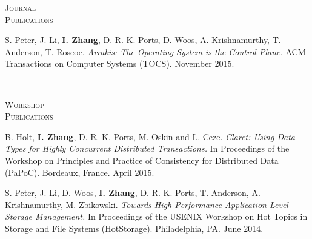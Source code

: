 \documentclass[10pt,minionpro]{report}
\newlength{\sectiongap}
\newlength{\sectioncolwidth}
\newlength{\colgap}
\newlength{\stuffwidth}
\newenvironment{rtable}{
  \begin{minipage}{\textwidth}
  }{
  \end{minipage}
}
\newenvironment{rsection}[1]{
  \begin{minipage}[t]{\sectioncolwidth}
    \textsc{#1}
  \end{minipage}
  \hspace{\colgap}
  \begin{minipage}[t]{\stuffwidth}
  }{
    \removelastskip
  \end{minipage}
  \\[\sectiongap]
}
\begin{document}
\begin{rtable}
\begin{rsection}{Journal\\Publications}
    S. Peter, J. Li, \textbf{I. Zhang}, D. R. K. Ports, D. Woos,
    A. Krishnamurthy, T. Anderson, T. Roscoe.  \textit{Arrakis: The
      Operating System is the Control Plane.}  ACM Transactions on
    Computer Systems (TOCS). November 2015.\\
  \end{rsection}


  
  \begin{rsection}{Workshop\\Publications}
    B. Holt, \textbf{I. Zhang}, D. R. K. Ports, M. Oskin and L. Ceze.
    \textit{Claret: Using Data Types for Highly Concurrent Distributed
      Transactions.} In Proceedings of the Workshop on Principles and
    Practice of Consistency for Distributed Data (PaPoC).  Bordeaux,
    France. April 2015.\\\vspace{-0.5em}


    S. Peter, J. Li, D. Woos, \textbf{I. Zhang}, D. R. K. Ports,
    T. Anderson, A. Krishnamurthy, M. Zbikowski. \textit{Towards
      High-Performance Application-Level Storage Management.} In
    Proceedings of the USENIX Workshop on Hot Topics in Storage and
    File Systems (HotStorage). Philadelphia, PA. June
    2014.
  \end{rsection}
\end{rtable}
\end{document}
